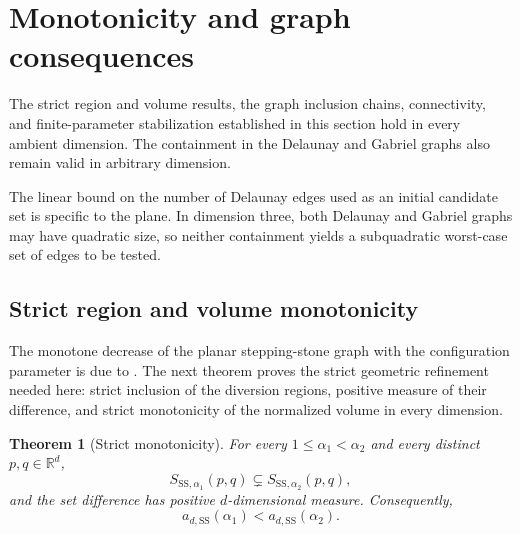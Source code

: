 \documentclass[a4paper,fleqn]{cas-dc}
\newtheorem{theorem}{Theorem}
\theoremstyle{definition}
\theoremstyle{remark}
\newcommand{\R}{\mathds{R}}
\newcommand{\0}{\mathbf{0}}
\begin{document}
\section{Monotonicity and graph consequences}
\label{sec:monotonicity-graphs}



The strict region and volume results, the graph inclusion chains,
connectivity, and finite-parameter stabilization established in this section
hold in every ambient dimension. 
The containment in the Delaunay and Gabriel graphs also
remain valid in arbitrary dimension.

The linear bound on the number of Delaunay edges used as an initial
candidate set is specific to the plane. In dimension three, both Delaunay
and Gabriel graphs may have quadratic size, so neither containment yields a
subquadratic worst-case set of edges to be tested.


\subsection{Strict region and volume monotonicity}

The monotone decrease of the planar stepping-stone graph with the
configuration parameter is due to
\citet[Theorem~3.3]{kannangara2018stepping}. The next theorem proves the
strict geometric refinement needed here: strict inclusion of the diversion
regions, positive measure of their difference, and strict monotonicity of the
normalized volume in every dimension.


\begin{theorem}[Strict monotonicity]\label{thm:monotonicity}
For every $1\leq\alpha_1<\alpha_2$ and every distinct $p,q\in\R^d$,
\begin{equation}
S_{\mathrm{SS},\alpha_1}(p,q)
\subsetneq
S_{\mathrm{SS},\alpha_2}(p,q),
\end{equation}
and the set difference has positive $d$-dimensional measure. Consequently,
\begin{equation}
 a_{d,\mathrm{SS}}(\alpha_1)<a_{d,\mathrm{SS}}(\alpha_2).
\end{equation}
\end{theorem}
\end{document}
